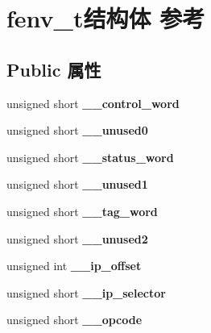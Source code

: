 \hypertarget{structfenv__t}{}\section{fenv\+\_\+t结构体 参考}
\label{structfenv__t}
\subsection*{Public 属性}
\begin{DoxyCompactItemize}
\item 
\mbox{\label{structfenv__t_ab03772ee9cd9515c9b1440042ab00c6f}} 
unsigned short {\bfseries \+\_\+\+\_\+control\+\_\+word}
\item 
\mbox{\label{structfenv__t_af6d5931e606521e458f4b07a735d801c}} 
unsigned short {\bfseries \+\_\+\+\_\+unused0}
\item 
\mbox{\label{structfenv__t_a4bab53d7da8ab79bd9e7c8147ac740ed}} 
unsigned short {\bfseries \+\_\+\+\_\+status\+\_\+word}
\item 
\mbox{\label{structfenv__t_af95dfdfa62ce011bd5d7b7f609d1ec44}} 
unsigned short {\bfseries \+\_\+\+\_\+unused1}
\item 
\mbox{\label{structfenv__t_a5a6d4b5f1ac8b7a7bf5c654ff02ca432}} 
unsigned short {\bfseries \+\_\+\+\_\+tag\+\_\+word}
\item 
\mbox{\label{structfenv__t_ae802e86e1ef26deb32140cb776712240}} 
unsigned short {\bfseries \+\_\+\+\_\+unused2}
\item 
\mbox{\label{structfenv__t_a349ecdd4524278bafd39b655ea804a7c}} 
unsigned int {\bfseries \+\_\+\+\_\+ip\+\_\+offset}
\item 
\mbox{\label{structfenv__t_a4eedb207a49dff40c57a7007d4406f36}} 
unsigned short {\bfseries \+\_\+\+\_\+ip\+\_\+selector}
\item 
\mbox{\label{structfenv__t_a3690f49b147e37878fa862e91e944710}} 
unsigned short {\bfseries \+\_\+\+\_\+opcode}
\item 
\mbox{\label{structfenv__t_ad5ae19e609b40e76861b6a1d789ae4fd}} 

\end{DoxyCompactItemize}
